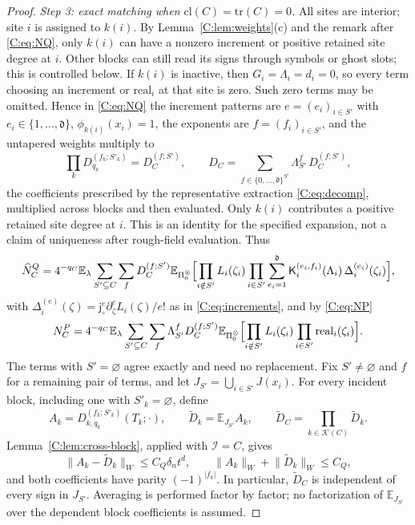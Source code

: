 \documentclass[11pt]{article}
\newcommand{\E}{\mathbb{E}}
\newcommand{\cK}{\mathcal{K}}
\newcommand{\norm}[1]{\lVert #1\rVert}
\newcommand{\abs}[1]{\lvert #1\rvert}
\newcommand{\jsh}{\mathsf{j}_\circ}
\newcommand{\dg}{\mathfrak{d}}
\newcommand{\K}{\mathsf{K}}
\newcommand{\real}{\mathrm{real}}
\begin{document}
\begin{proof}
\emph{Step 3: exact matching when \(\mathrm{cl}(C)=\mathrm{tr}(C)=0\).}
All sites are interior; site \(i\) is assigned to \(k(i)\).  By
Lemma~\ref{C:lem:weights}(c) and the remark after \eqref{C:eq:NQ}, only
\(k(i)\) can have a nonzero increment or positive retained site degree
at \(i\).  Other blocks can still read its signs through symbols or
ghost slots; this is controlled below.  If \(k(i)\) is inactive, then
\(G_i=\Lambda_i=d_i=0\), so every term choosing an increment or
\(\real_i\) at that site is zero.  Such zero terms may be omitted.  Hence in
\eqref{C:eq:NQ} the increment patterns are \(e=(e_i)_{i\in S'}\) with
\(e_i\in\{1,\dots,\dg\}\), \(\phi_{k(i)}(x_i)=1\), the exponents are
\(f=(f_i)_{i\in S'}\), and the untapered weights multiply to
\[
 \prod_kD^{(f_k;S'_k)}_{q_k}=D_C^{(f;S')},\qquad
 D_C=\sum_{f\in\{0,\dots,\dg\}^{S'}}\Lambda_{S'}^f\,D_C^{(f;S')},
\]
the coefficients prescribed by the representative extraction
\eqref{C:eq:decomp}, multiplied across blocks and then evaluated.
Only \(k(i)\) contributes a positive retained site degree at \(i\).
This is an identity for the specified expansion, not a claim of
uniqueness after rough-field evaluation.  Thus
\begin{equation}
 \widehat N^Q_C=4^{-q_C}\E_\lambda\sum_{S'\subseteq C}\sum_{f}D_C^{(f;S')}
 \E_{\Pi_0^\otimes}\Bigl[\prod_{i\notin S'}L_i(\zeta_i)\prod_{i\in S'}
 \sum_{e_i=1}^{\dg}\K_i^{(e_i,f_i)}(\Lambda_i)\,\Delta_i^{(e_i)}(\zeta_i)\Bigr],
 \label{C:eq:NQ-interior}
\end{equation}
with \(\Delta_i^{(e)}(\zeta)=\jsh^e\partial_\zeta^eL_i(\zeta)/e!\) as in
\eqref{C:eq:increments}, and by \eqref{C:eq:NP}
\begin{equation}
 N^P_C=4^{-q_C}\E_\lambda\sum_{S'\subseteq C}\sum_{f}\Lambda_{S'}^fD_C^{(f;S')}
 \E_{\Pi_0^\otimes}\Bigl[\prod_{i\notin S'}L_i(\zeta_i)\prod_{i\in S'}\real_i(\zeta_i)\Bigr].
 \label{C:eq:NP-interior}
\end{equation}
The terms with \(S'=\varnothing\) agree exactly and need no
replacement.  Fix \(S'\ne\varnothing\) and \(f\) for a remaining pair of
terms, and let \(J_{S'}=\bigcup_{i\in S'}J(x_i)\).  For every incident
block, including one with \(S'_k=\varnothing\), define
\[
 A_k=D_{k,q_k}^{(f_k;S'_k)}(T_k;\cdot),\qquad
 \widetilde D_k=\E_{J_{S'}}A_k,\qquad
 \widetilde D_C=\prod_{k\in\cK(C)}\widetilde D_k.
\]
Lemma~\ref{C:lem:cross-block}, applied with \(\mathcal I=C\), gives
\[
 \norm{A_k-\widetilde D_k}_W\le C_Q\delta_nt^d,
 \qquad \norm{A_k}_W+\norm{\widetilde D_k}_W\le C_Q,
\]
and both coefficients have parity \((-1)^{\abs{f_k}}\).
In particular, \(\widetilde D_C\) is independent of every sign in
\(J_{S'}\).  Averaging is performed factor by factor; no factorization
of \(\E_{J_{S'}}\) over the dependent block coefficients is assumed.


\end{proof}
\end{document}
